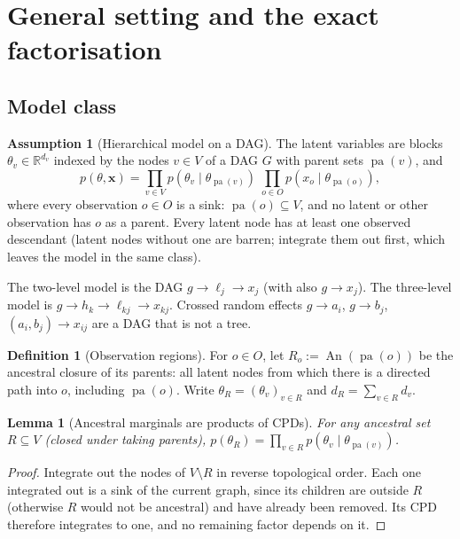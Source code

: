 \documentclass[11pt]{article}
\newtheorem{lemma}[theorem]{Lemma}
\theoremstyle{definition}
\newtheorem{definition}{Definition}
\newtheorem{assumption}{Assumption}
\theoremstyle{remark}
\newcommand{\R}{\mathbb{R}}
\newcommand{\X}{\mathbf{x}}
\newcommand{\An}{\operatorname{An}}
\newcommand{\pa}{\operatorname{pa}}
\begin{document}
\section{General setting and the exact factorisation}\label{sec:general}

\subsection{Model class}

\begin{assumption}[Hierarchical model on a DAG]\label{ass:dag}
The latent variables are blocks $\theta_v\in\R^{d_v}$ indexed by the nodes
$v\in V$ of a DAG $G$ with parent sets $\pa(v)$, and
\[
p(\theta,\X)=\prod_{v\in V}p(\theta_v\mid\theta_{\pa(v)})\;\prod_{o\in O}p(x_o\mid\theta_{\pa(o)}),
\]
where every observation $o\in O$ is a sink: $\pa(o)\subseteq V$, and no latent
or other observation has $o$ as a parent. Every latent node has at least one
observed descendant (latent nodes without one are barren; integrate them out
first, which leaves the model in the same class).
\end{assumption}
The two-level model is the DAG $g\to\ell_j\to x_j$ (with also $g\to x_j$). The
three-level model is $g\to h_k\to\ell_{kj}\to x_{kj}$. Crossed random effects
$g\to a_i$, $g\to b_j$, $(a_i,b_j)\to x_{ij}$ are a DAG that is not a tree.

\begin{definition}[Observation regions]
For $o\in O$, let $R_o:=\An(\pa(o))$ be the ancestral closure of its parents:
all latent nodes from which there is a directed path into $o$, including
$\pa(o)$. Write $\theta_R=(\theta_v)_{v\in R}$ and $d_R=\sum_{v\in R}d_v$.
\end{definition}

\begin{lemma}[Ancestral marginals are products of CPDs]\label{lem:ancestral}
For any ancestral set $R\subseteq V$ (closed under taking parents),
$p(\theta_R)=\prod_{v\in R}p(\theta_v\mid\theta_{\pa(v)})$.
\end{lemma}
\begin{proof}
Integrate out the nodes of $V\setminus R$ in reverse topological order. Each one
integrated out is a sink of the current graph, since its children are outside
$R$ (otherwise $R$ would not be ancestral) and have already been removed. Its
CPD therefore integrates to one, and no remaining factor depends on it.
\end{proof}
\end{document}
